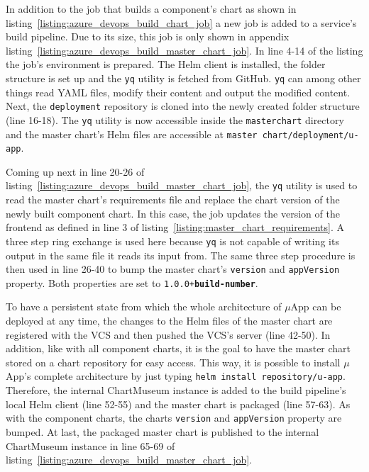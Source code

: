 In addition to the job that builds a component's chart as shown in
listing~\ref{listing:azure_devops_build_chart_job} a new job is added to a
service's build pipeline. Due to its size, this job is only shown in appendix
listing~\ref{listing:azure_devops_build_master_chart_job}. In line 4-14 of the
listing the job's environment is prepared. The Helm client is installed, the
folder structure is set up and the \texttt{yq} utility is fetched from GitHub.
\texttt{yq} can among other things read YAML files, modify their content and
output the modified content. Next, the \texttt{deployment} repository is cloned
into the newly created folder structure (line 16-18). The \texttt{yq} utility
is now accessible inside the \texttt{master\textunderscore chart} directory and
the master chart's Helm files are accessible at \texttt{master\textunderscore
chart/deployment/u-app}.

Coming up next in line 20-26 of
listing~\ref{listing:azure_devops_build_master_chart_job}, the \texttt{yq}
utility is used to read the master chart's requirements file and replace the
chart version of the newly built component chart. In this case, the job updates
the version of the frontend as defined in line 3 of
listing~\ref{listing:master_chart_requirements}. A three step ring exchange is
used here because \texttt{yq} is not capable of writing its output in the same
file it reads its input from. The same three step procedure is then used in
line 26-40 to bump the master chart's \texttt{version} and \texttt{appVersion}
property. Both properties are set to \texttt{1.0.0+\textbf{build-number}}.

To have a persistent state from which the whole architecture of $\mu$App can be
deployed at any time, the changes to the Helm files of the master chart are
registered with the \ac{VCS} and then pushed the \ac{VCS}'s server (line
42-50). In addition, like with all component charts, it is the goal to have the
master chart stored on a chart repository for easy access. This way, it is
possible to install $\mu$App's complete architecture by just typing
\texttt{helm install repository/u-app}. Therefore, the internal ChartMuseum
instance is added to the build pipeline's local Helm client (line 52-55) and
the master chart is packaged (line 57-63). As with the component charts, the
charts \texttt{version} and \texttt{appVersion} property are bumped. At last,
the packaged master chart is published to the internal ChartMuseum instance in
line 65-69 of listing~\ref{listing:azure_devops_build_master_chart_job}.

